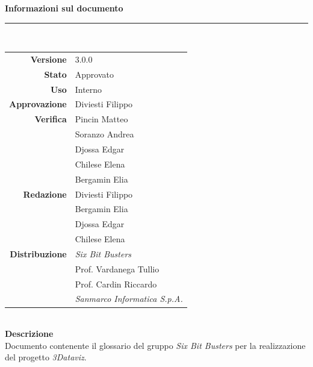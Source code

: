 \begin{titlepage}
\begin{center}
	\large \textbf{Informazioni sul documento} \\
	\rule{0.6\textwidth}{0.4pt}
	\\[0.5cm]
	\begin{tabular}{r|l}
		\textbf{Versione} & 3.0.0\\
		\textbf{Stato} & Approvato\\
		\textbf{Uso} & Interno\\                         
		\textbf{Approvazione} & Diviesti Filippo\\                      
		\textbf{Verifica} & Pincin Matteo \\ & Soranzo Andrea \\ & Djossa Edgar \\ & Chilese Elena\\ & Bergamin Elia\\                        
		\textbf{Redazione} & Diviesti Filippo\\ & Bergamin Elia \\ & Djossa Edgar\\ & Chilese Elena \\
		\textbf{Distribuzione} & \textit{Six Bit Busters} \\ & Prof. Vardanega Tullio \\ & Prof. Cardin Riccardo \\ & \textit{Sanmarco Informatica S.p.A.}
	\end{tabular}	
	\\[0.8cm]

	\large \textbf{Descrizione} \\
	Documento contenente il glossario del gruppo \textit{Six Bit Busters} per la realizzazione del progetto \textit{3Dataviz}.
	
	\end{center}
\end{titlepage}

